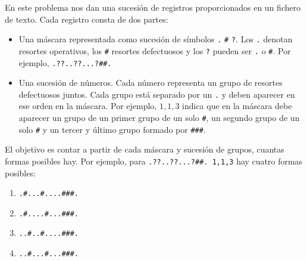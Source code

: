 \documentclass[a4paper,12pt]{article}
\begin{document}
En este problema nos dan una sucesión de registros proporcionados en un fichero de texto. Cada registro consta de dos partes:
\begin{itemize}
    \item Una máscara representada como sucesión de símbolos \lstinline{.} \lstinline{#} \lstinline{?}. Los \lstinline{.} denotan resortes operativos, los \lstinline{#} resortes defectuosos y los \lstinline{?} pueden ser \lstinline{.} o \lstinline{#}. Por ejemplo, \lstinline{.??..??...?##.}
    \item Una sucesión de números. Cada número representa un grupo de resortes defectuosos juntos. Cada grupo está separado por un \lstinline{.} y deben aparecer en ese orden en la máscara. Por ejemplo, $1,1,3$ indica que en la máscara debe aparecer un grupo de un primer grupo de un solo \lstinline{#}, un segundo grupo de un solo \lstinline{#} y un tercer y último grupo formado por \lstinline{###}.
\end{itemize}

El objetivo es contar a partir de cada máscara y sucesión de grupos, cuantas formas posibles hay. Por ejemplo, para
\lstinline{.??..??...?##. 1,1,3} hay cuatro formas posibles:

\begin{enumerate}[label=(\arabic*)]
    \item \lstinline{.#...#....###.}
    \item \lstinline{.#....#...###.}
    \item \lstinline{..#..#....###.}
    \item \lstinline{..#...#...###.}
\end{enumerate}
\end{document}

